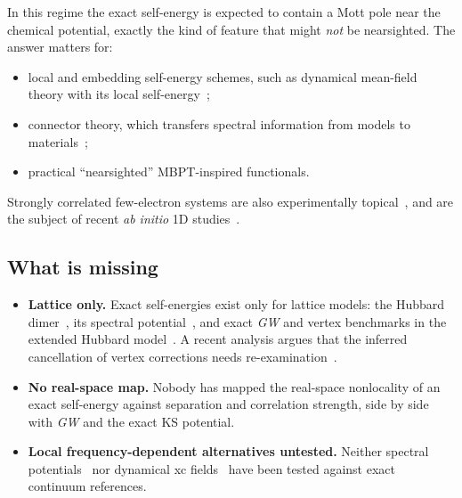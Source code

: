 \documentclass[11pt,a4paper]{article}
\newcommand{\GW}{\textit{GW}}
\begin{document}
In this regime the exact self-energy is expected to contain a Mott pole near the chemical potential, exactly the kind of feature that might \emph{not} be nearsighted. The answer matters for:
\begin{itemize}
\item local and embedding self-energy schemes, such as dynamical mean-field theory with its local self-energy~\cite{georges1996};
\item connector theory, which transfers spectral information from models to materials~\cite{gatti2007,vanzini2022,vanzini2017,vanzini2018};
\item practical ``nearsighted'' MBPT-inspired functionals.
\end{itemize}

Strongly correlated few-electron systems are also experimentally topical~\cite{pecker2013,shapir2019,corrigan2021,li2024}, and are the subject of recent \emph{ab initio} 1D studies~\cite{lagasco2026,lagasco2025}.

\subsection{What is missing}
\begin{itemize}
\item \textbf{Lattice only.} Exact self-energies exist only for lattice models: the Hubbard dimer~\cite{romaniello2009}, its spectral potential~\cite{vanzini2018}, and exact \GW{} and vertex benchmarks in the extended Hubbard model~\cite{exthubbard2026}. A recent analysis argues that the inferred cancellation of vertex corrections needs re-examination~\cite{forster2024}.
\item \textbf{No real-space map.} Nobody has mapped the real-space nonlocality of an exact self-energy against separation and correlation strength, side by side with \GW{} and the exact KS potential.
\item \textbf{Local frequency-dependent alternatives untested.} Neither spectral potentials~\cite{gatti2007,vanzini2017} nor dynamical xc fields~\cite{aryasetiawan2025} have been tested against exact continuum references.
\end{itemize}
\end{document}
